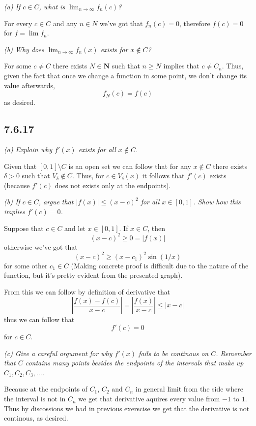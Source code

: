 \documentclass[11pt,oneside,titlepage]{book}
\begin{document}
\textit{(a) If $c \in C$, what is $\lim_{n \to \infty} f_n(c)$?}

For every $c \in C$ and any $n \in N$ we've got that $f_n(c) = 0$, therefore
$f(c) = 0$ for $f = \lim f_n$.

\textit{(b) Why does $\lim_{n \to \infty}{f_n(x)}$ exists for
  $x \notin C$?}


For some $c \neq C$ there exists $N \in \textbf{N}$ such that
$n \geq N$ implies that $c \neq C_n$. Thus, given the fact that
once we change a function in some point, we don't change its value
afterwards, 
$$f_N(c) = f(c)$$
as desired.

\subsection*{7.6.17}

\textit{(a) Explain why $f'(x)$ exists for all $x \notin C$.}

Given that $[0, 1] \setminus C$ is an open set we can follow that for any
$x \notin C$ there exists $\delta > 0$ such that $V_\delta \notin C$. Thus,
for $c \in V_\delta(x)$ it follows that $f'(c)$ exists (because $f'(c)$ does
not exists only at the endpoints).

\textit{(b) If $c \in C$, argue that $|f(x)| \leq (x - c)^2$ for all
  $x \in [0, 1]$. Show how this implies $f'(c) = 0$.}

Suppose that $c \in C$ and let $x \in [0, 1]$. If $x \in C$, then
$$(x - c)^2 \geq 0 = |f(x)|$$
otherwise we've got that
$$(x - c)^2 \geq (x - c_1)^2 \sin (1/x)$$
for some other $c_1 \in C$ (Making concrete proof is difficult due to the
nature of the function, but it's pretty evident from the presented graph).

From this we can follow by definition of derivative that
$$\left|\frac{f(x) - f(c)}{x - c}\right| = \left|\frac{f(x)}{x - c}\right|
\leq |x - c|$$
thus we can follow that
$$f'(c) = 0$$
for $c \in C$.

\textit{(c) Give a careful argument for why $f'(x)$ fails to be continous on
  $C$. Remember that $C$ contains many points besides the endpoints of the
  intervals that make up $C_1, C_2, C_3, ... $.}

Because at the endpoints of $C_1$, $C_2$ and $C_n$ in general limit from
the side where the interval is not in $C_n$ we get that derivative
aquires every value from $-1$ to $1$. Thus by discossions we had in previous
exerscise we get that the derivative is not continous, as desired.
\end{document}
